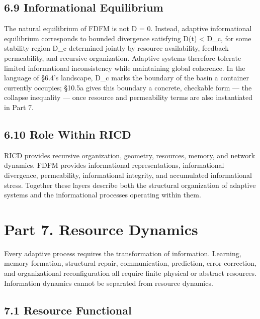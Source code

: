 \documentclass[
]{article}
\begin{document}
\hypertarget{informational-equilibrium}{%
\subsection{6.9 Informational
Equilibrium}\label{informational-equilibrium}}

The natural equilibrium of FDFM is not D = 0. Instead, adaptive
informational equilibrium corresponds to bounded divergence satisfying
D(t) \textless{} D\_c, for some stability region D\_c determined jointly
by resource availability, feedback permeability, and recursive
organization. Adaptive systems therefore tolerate limited informational
inconsistency while maintaining global coherence. In the language of
§6.4's landscape, D\_c marks the boundary of the basin a container
currently occupies; §10.5a gives this boundary a concrete, checkable
form --- the collapse inequality --- once resource and permeability
terms are also instantiated in Part 7.

\hypertarget{role-within-ricd}{%
\subsection{6.10 Role Within RICD}\label{role-within-ricd}}

RICD provides recursive organization, geometry, resources, memory, and
network dynamics. FDFM provides informational representations,
informational divergence, permeability, informational integrity, and
accumulated informational stress. Together these layers describe both
the structural organization of adaptive systems and the informational
processes operating within them.

\hypertarget{part-7.-resource-dynamics}{%
\section{Part 7. Resource Dynamics}\label{part-7.-resource-dynamics}}

Every adaptive process requires the transformation of information.
Learning, memory formation, structural repair, communication,
prediction, error correction, and organizational reconfiguration all
require finite physical or abstract resources. Information dynamics
cannot be separated from resource dynamics.

\hypertarget{resource-functional}{%
\subsection{7.1 Resource Functional}\label{resource-functional}}
\end{document}
